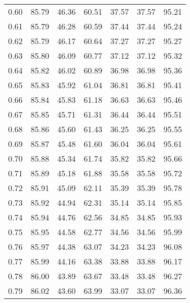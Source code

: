 \begin{tabular}{|c|c|c|c|c|c|c|}
      0.60 &     85.79 &     46.36 &      60.51 &   37.57 &      37.57 &         95.21 \\
      0.61 &     85.79 &     46.28 &      60.59 &   37.44 &      37.44 &         95.24 \\
      0.62 &     85.79 &     46.17 &      60.64 &   37.27 &      37.27 &         95.27 \\
      0.63 &     85.80 &     46.09 &      60.77 &   37.12 &      37.12 &         95.32 \\
      0.64 &     85.82 &     46.02 &      60.89 &   36.98 &      36.98 &         95.36 \\
      0.65 &     85.83 &     45.92 &      61.04 &   36.81 &      36.81 &         95.41 \\
      0.66 &     85.84 &     45.83 &      61.18 &   36.63 &      36.63 &         95.46 \\
      0.67 &     85.85 &     45.71 &      61.31 &   36.44 &      36.44 &         95.51 \\
      0.68 &     85.86 &     45.60 &      61.43 &   36.25 &      36.25 &         95.55 \\
      0.69 &     85.87 &     45.48 &      61.60 &   36.04 &      36.04 &         95.61 \\
      0.70 &     85.88 &     45.34 &      61.74 &   35.82 &      35.82 &         95.66 \\
      0.71 &     85.89 &     45.18 &      61.88 &   35.58 &      35.58 &         95.72 \\
      0.72 &     85.91 &     45.09 &      62.11 &   35.39 &      35.39 &         95.78 \\
      0.73 &     85.92 &     44.94 &      62.31 &   35.14 &      35.14 &         95.85 \\
      0.74 &     85.94 &     44.76 &      62.56 &   34.85 &      34.85 &         95.93 \\
      0.75 &     85.95 &     44.58 &      62.77 &   34.56 &      34.56 &         95.99 \\
      0.76 &     85.97 &     44.38 &      63.07 &   34.23 &      34.23 &         96.08 \\
      0.77 &     85.99 &     44.16 &      63.38 &   33.88 &      33.88 &         96.17 \\
      0.78 &     86.00 &     43.89 &      63.67 &   33.48 &      33.48 &         96.27 \\
      0.79 &     86.02 &     43.60 &      63.99 &   33.07 &      33.07 &         96.36 \\

\end{tabular}
